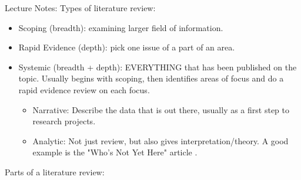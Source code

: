 \documentclass{TC}
\begin{document}
Lecture Notes:
Types of literature review:
	\begin{itemize}
	\item Scoping (breadth): examining larger field of information.
	\item Rapid Evidence (depth): pick one issue of a part of an area.
	\item Systemic (breadth + depth): EVERYTHING that has been published on the topic. Usually begins with scoping, then identifies areas of focus and do a rapid evidence review on each focus.
		\begin{itemize}
		\item Narrative: Describe the data that is out there, usually as a first step to research projects.
		\item Analytic: Not just review, but also gives interpretation/theory. A good example is the "Who's Not Yet Here" article \parencite{burch_whos_2006}.
		\end{itemize}
	\end{itemize}
Parts of a literature review:
\end{document}

